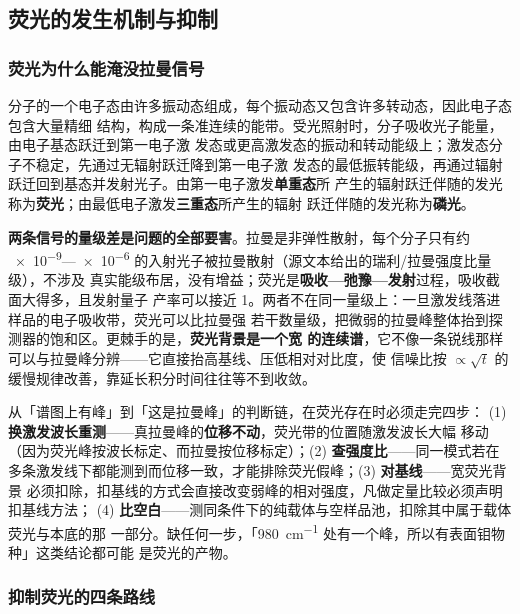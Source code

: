 \subsection{荧光的发生机制与抑制}

\subsubsection{荧光为什么能淹没拉曼信号}

分子的一个电子态由许多振动态组成，每个振动态又包含许多转动态，因此电子态包含大量精细
结构，构成一条准连续的能带。受光照射时，分子吸收光子能量，由电子基态跃迁到第一电子激
发态或更高激发态的振动和转动能级上；激发态分子不稳定，先通过无辐射跃迁降到第一电子激
发态的最低振转能级，再通过辐射跃迁回到基态并发射光子。由第一电子激发\textbf{单重态}所
产生的辐射跃迁伴随的发光称为\textbf{荧光}；由最低电子激发\textbf{三重态}所产生的辐射
跃迁伴随的发光称为\textbf{磷光}。

\begin{principle}
\textbf{两条信号的量级差是问题的全部要害}。拉曼是非弹性散射，每个分子只有约
\num{e-9}—\num{e-6} 的入射光子被拉曼散射（源文本给出的瑞利/拉曼强度比量级），不涉及
真实能级布居，没有增益；荧光是\textbf{吸收—弛豫—发射}过程，吸收截面大得多，且发射量子
产率可以接近 1。两者不在同一量级上：一旦激发线落进样品的电子吸收带，荧光可以比拉曼强
若干数量级，把微弱的拉曼峰整体抬到探测器的饱和区。更棘手的是，\textbf{荧光背景是一个宽
的连续谱}，它不像一条锐线那样可以与拉曼峰分辨——它直接抬高基线、压低相对对比度，使
信噪比按 $\propto\sqrt{t}$ 的缓慢规律改善，靠延长积分时间往往等不到收敛。
\end{principle}

\begin{dataflow}
从「谱图上有峰」到「这是拉曼峰」的判断链，在荧光存在时必须走完四步：
(1) \textbf{换激发波长重测}——真拉曼峰的\textbf{位移不动}，荧光带的位置随激发波长大幅
移动（因为荧光峰按波长标定、而拉曼按位移标定）；(2) \textbf{查强度比}——同一模式若在
多条激发线下都能测到而位移一致，才能排除荧光假峰；(3) \textbf{对基线}——宽荧光背景
必须扣除，扣基线的方式会直接改变弱峰的相对强度，凡做定量比较必须声明扣基线方法；
(4) \textbf{比空白}——测同条件下的纯载体与空样品池，扣除其中属于载体荧光与本底的那
一部分。缺任何一步，「\qty{980}{cm^{-1}} 处有一个峰，所以有表面钼物种」这类结论都可能
是荧光的产物。
\end{dataflow}

\subsubsection{抑制荧光的四条路线}

